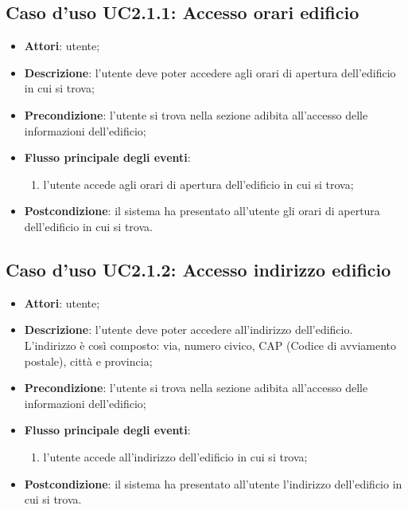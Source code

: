 \documentclass[../AnalisiDeiRequisiti.tex]{subfiles}
\begin{document}
\subsection{Caso d'uso UC2.1.1: Accesso orari edificio}
\begin{itemize}
	\item \textbf{Attori}: utente;
	\item \textbf{Descrizione}: l'utente deve poter accedere agli orari di apertura dell'edificio in cui si trova; 
	\item \textbf{Precondizione}: l'utente si trova nella sezione adibita all'accesso delle informazioni dell'edificio;
	
	\item \textbf{Flusso principale degli eventi}:
	\begin{enumerate}
		\item l'utente accede agli orari di apertura dell'edificio in cui si trova;
		
	\end{enumerate}
	\item \textbf{Postcondizione}: il sistema ha presentato all'utente gli orari di apertura dell'edificio in cui si trova.
\end{itemize}
\hypertarget{UC2.1.2}{}
\subsection{Caso d'uso UC2.1.2: Accesso indirizzo edificio}
\begin{itemize}
	\item \textbf{Attori}: utente;
	\item \textbf{Descrizione}: l'utente deve poter accedere all'indirizzo dell'edificio. L'indirizzo è così composto: via, numero civico, CAP (Codice di avviamento postale), città e provincia; 
	\item \textbf{Precondizione}: l'utente si trova nella sezione adibita all'accesso delle informazioni dell'edificio;
	
	\item \textbf{Flusso principale degli eventi}:
	\begin{enumerate}
		\item l'utente accede all'indirizzo dell'edificio in cui si trova;
		
	\end{enumerate}
	\item \textbf{Postcondizione}: il sistema ha presentato all'utente l'indirizzo dell'edificio in cui si trova.
\end{itemize}
\hypertarget{UC2.1.3}{}
\end{document}
